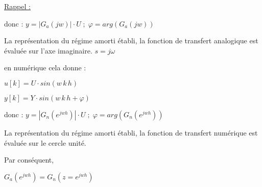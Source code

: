
\underline{Rappel :}

\begin{center}
\end{center}

donc : $y = |G_a(jw)| \cdot U\;; \;\varphi = arg(G_a(jw))$

La représentation du régime amorti établi,
la fonction de transfert analogique est évaluée sur l'axe imaginaire.
$s = j\omega$ 

en numérique cela donne : 

$u[k] = U\cdot sin(w\,k\,h)$

$y[k] = Y\cdot sin(w\,k\,h+\varphi)$

donc : $y = |G_n(e^{jwh})| \cdot U\;; \;\varphi = arg(G_n(e^{jwh}))$


La représentation du régime amorti établi,
la fonction de transfert numérique est évaluée sur le cercle unité.

Par conséquent, 

$G_a(e^{jwh}) = G_n(z = e^{jwh})$